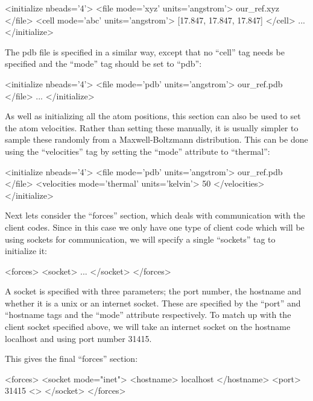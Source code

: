 \documentclass[11pt,english,fleqn]{report}
\newenvironment{code}{%
\footnotesize 
\verbatim
}{
\endverbatim
\normalsize
}
\begin{document}
\begin{code}
<initialize nbeads='4'>
   <file mode='xyz' units='angstrom'> our_ref.xyz </file>
   <cell mode='abc' units='angstrom'>
      [17.847, 17.847, 17.847]
   </cell>
   ...
</initialize>
\end{code}

The pdb file is specified in a similar way, except that no {}``cell''
tag needs be specified and the {}``mode'' tag should be
set to {}``pdb'':

\begin{code}
<initialize nbeads='4'>
   <file mode='pdb' units='angstrom'> our_ref.pdb </file>
   ...
</initialize>
\end{code}

As well as initializing all the atom positions, this section
can also be used to set the atom velocities. Rather than setting these manually,
it is usually simpler to sample these randomly from a Maxwell-Boltzmann
distribution. This can be done using the
{}``velocities'' tag by setting the {}``mode'' attribute to {}``thermal'':

\begin{code}
<initialize nbeads='4'>
   <file mode='pdb' units='angstrom'> our_ref.pdb </file>
   <velocities mode='thermal' units='kelvin'> 50 </velocities>
</initialize>
\end{code}

Next lets consider the {}``forces'' section, which deals with communication
with the client codes. Since in this case we only have one type of
client code which will be using sockets for communication, we will
specify a single {}``sockets'' tag to initialize it:

\begin{code}
<forces>
   <socket>
      ...
   </socket>
</forces>
\end{code}

A socket is specified with three parameters; the port number, the
hostname and whether it is a unix or an internet socket. 
These are specified by the {}``port'' and {}``hostname tags
and the {}``mode'' attribute respectively.
To match up with the client socket specified above,
we will take an internet socket on the hostname localhost and
using port number 31415. 

This gives the final {}``forces'' section:

\begin{code}
<forces>
   <socket mode="inet">
      <hostname> localhost </hostname>
      <port> 31415 <\port>
   </socket>
</forces>
\end{code}
\end{document}
